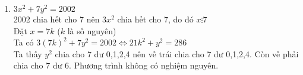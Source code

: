 \begin{bt}
{\begin{enumerate}
            $\Leftrightarrow 2b^2+2b+a^2+a=251 \Leftrightarrow 2b(b+1)+a(a+1)=251$\\
            Vế trái là số chẵn, vế phải là số lẻ. Phương trình không có nghiệm nguyên.
            \item $3x^2+7y^2=2002$\\
            2002 chia hết cho 7 nên $3x^2$ chia hết cho 7, do đó $x \vdots 7$\\
            Đặt $x=7k$ ($k$ là số nguyên)\\
            Ta có $3(7k)^2+7y^2=2002 \Leftrightarrow 21k^2+y^2=286$\\
            Ta thấy $y^2$ chia cho 7 dư 0,1,2,4 nên vế trái chia cho 7 dư 0,1,2,4. Còn vế phải chia cho 7 dư 6. Phương trình không có nghiệm nguyên. 
\end{enumerate}    
    }
\end{bt}

